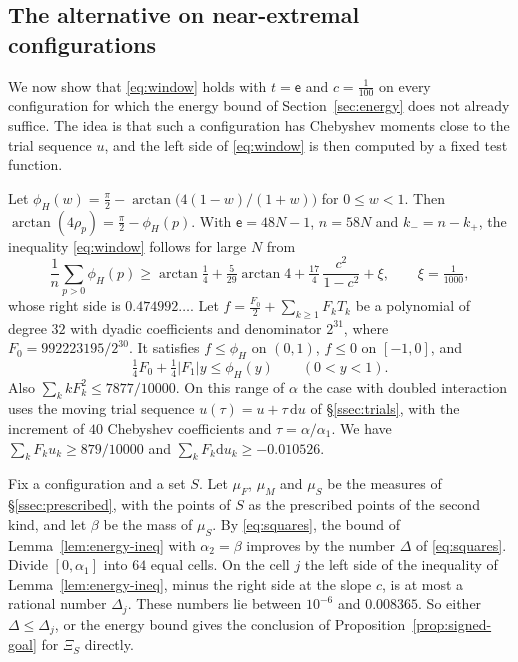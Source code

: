 \documentclass[11pt]{amsart}
\theoremstyle{definition}
\theoremstyle{remark}
\numberwithin{equation}{section}
\begin{document}
\subsection{The alternative on near-extremal configurations}\label{ssec:alternative}
We now show that \eqref{eq:window} holds with $t=\mathsf e$ and $c=\frac1{100}$ on every configuration for which the
energy bound of Section~\ref{sec:energy} does not already suffice. The idea is that such a configuration has
Chebyshev moments close to the trial sequence $u$, and the left side of \eqref{eq:window} is then computed by a
fixed test function.

Let $\phi_H(w)=\frac\pi2-\arctan\bigl(4(1-w)/(1+w)\bigr)$ for $0\le w<1$. Then $\arctan(4\rho_p)=\frac\pi2-\phi_H(p)$.
With $\mathsf e=48N-1$, $n=58N$ and $k_-=n-k_+$, the inequality \eqref{eq:window} follows for large $N$ from
\begin{equation}\label{eq:phaseneed}
 \frac1n\sum_{p>0}\phi_H(p)\ge\arctan\tfrac14+\tfrac5{29}\arctan4+\tfrac{17}4\,\frac{c^2}{1-c^2}+\xi,\qquad \xi=\tfrac1{1000},
\end{equation}
whose right side is $0.474992\ldots$. Let $f=\frac{F_0}2+\sum_{k\ge1}F_kT_k$ be a polynomial of degree $32$ with
dyadic coefficients and denominator $2^{31}$, where $F_0=992223195/2^{30}$. 
It satisfies $f\le\phi_H$ on $(0,1)$, $f\le0$ on $[-1,0]$, and
\begin{equation}\label{eq:testS}
 \tfrac14F_0+\tfrac14|F_1|y\le\phi_H(y)\qquad(0<y<1).
\end{equation}
Also $\sum_kkF_k^2\le7877/10000$. On this range of $\alpha$ the case with doubled interaction uses the moving trial
sequence $u(\tau)=u+\tau\,\mathrm du$ of \S\ref{ssec:trials}, with the increment of $40$ Chebyshev coefficients and
$\tau=\alpha/\alpha_1$. We have $\sum_kF_ku_k\ge879/10000$ and $\sum_kF_k\mathrm du_k\ge-0.010526$.

Fix a configuration and a set $S$. Let $\mu_F$, $\mu_M$ and $\mu_S$ be the measures of \S\ref{ssec:prescribed}, with the points of $S$ as the
prescribed points of the second kind, and let $\beta$ be the mass of $\mu_S$. By \eqref{eq:squares}, the bound of Lemma~\ref{lem:energy-ineq} with
$\alpha_2=\beta$ improves by the number $\Delta$ of \eqref{eq:squares}. Divide $[0,\alpha_1]$ into $64$ equal cells. On the cell $j$ the
left side of the inequality of Lemma~\ref{lem:energy-ineq}, minus the right side at the slope $c$, is at most a rational number $\Delta_j$.
These numbers lie between $10^{-6}$ and $0.008365$. So either $\Delta\le\Delta_j$, or the energy bound gives the conclusion of
Proposition~\ref{prop:signed-goal} for $\Xi_S$ directly.
\end{document}

